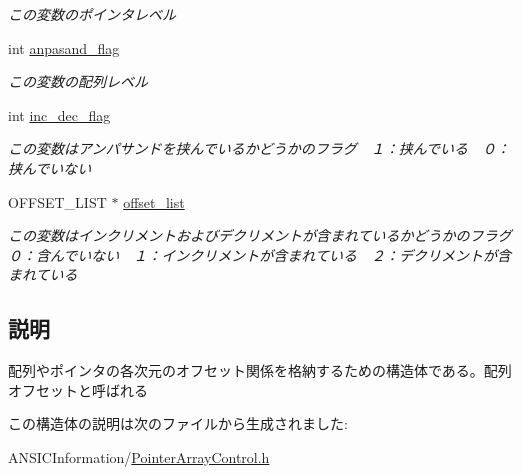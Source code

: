 \begin{DoxyCompactItemize}
\begin{DoxyCompactList}\small\item\em この変数のポインタレベル \item\end{DoxyCompactList}\item 
\hypertarget{structarray__offset_abb7708411833c87b184d43809fd0d0fa}{
int \hyperlink{structarray__offset_abb7708411833c87b184d43809fd0d0fa}{anpasand\_\-flag}}
\label{structarray__offset_abb7708411833c87b184d43809fd0d0fa}

\begin{DoxyCompactList}\small\item\em この変数の配列レベル \item\end{DoxyCompactList}\item 
\hypertarget{structarray__offset_a6a247a3ddfb4d6ae418c81521b3b327e}{
int \hyperlink{structarray__offset_a6a247a3ddfb4d6ae418c81521b3b327e}{inc\_\-dec\_\-flag}}
\label{structarray__offset_a6a247a3ddfb4d6ae418c81521b3b327e}

\begin{DoxyCompactList}\small\item\em この変数はアンパサンドを挟んでいるかどうかのフラグ　１：挟んでいる　０：挟んでいない \item\end{DoxyCompactList}\item 
\hypertarget{structarray__offset_a3b07fc99c154fe2d99d1a31277897c65}{
OFFSET\_\-LIST $\ast$ \hyperlink{structarray__offset_a3b07fc99c154fe2d99d1a31277897c65}{offset\_\-list}}
\label{structarray__offset_a3b07fc99c154fe2d99d1a31277897c65}

\begin{DoxyCompactList}\small\item\em この変数はインクリメントおよびデクリメントが含まれているかどうかのフラグ　０：含んでいない　１：インクリメントが含まれている　２：デクリメントが含まれている \item\end{DoxyCompactList}\end{DoxyCompactItemize}


\subsection{説明}
配列やポインタの各次元のオフセット関係を格納するための構造体である。配列オフセットと呼ばれる 

この構造体の説明は次のファイルから生成されました:\begin{DoxyCompactItemize}
\item 
ANSICInformation/\hyperlink{PointerArrayControl_8h}{PointerArrayControl.h}\end{DoxyCompactItemize}
